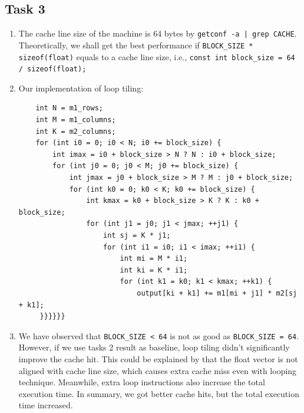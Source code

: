 \documentclass[a4paper, DIV12, headsepline]{scrartcl}
\begin{document}


\subsection*{Task 3}
\begin{enumerate}[label=\alph*)]
\item The cache line size of the machine is 64 bytes by \texttt{getconf -a | grep CACHE}. Theoretically, we shall get the best performance if \verb|BLOCK_SIZE * sizeof(float)| equals to a cache line size, i.e., \verb|const int block_size = 64 / sizeof(float);|

\item Our implementation of loop tiling:
\begin{verbatim}  
    int N = m1_rows;
    int M = m1_columns;
    int K = m2_columns;
    for (int i0 = 0; i0 < N; i0 += block_size) {
        int imax = i0 + block_size > N ? N : i0 + block_size;
        for (int j0 = 0; j0 < M; j0 += block_size) {
            int jmax = j0 + block_size > M ? M : j0 + block_size;
            for (int k0 = 0; k0 < K; k0 += block_size) {
                int kmax = k0 + block_size > K ? K : k0 + block_size;
                for (int j1 = j0; j1 < jmax; ++j1) {
                    int sj = K * j1;
                    for (int i1 = i0; i1 < imax; ++i1) {
                        int mi = M * i1;
                        int ki = K * i1;
                        for (int k1 = k0; k1 < kmax; ++k1) {
                            output[ki + k1] += m1[mi + j1] * m2[sj + k1];
     }}}}}}
\end{verbatim}
\item We have observed that \verb|BLOCK_SIZE < 64| is not as good as \verb|BLOCK_SIZE = 64|. However, if we use tasks 2 result as baseline, loop tiling didn't significantly improve the cache hit. This could be explained by that the float vector is not aligned with cache line size, which causes extra cache miss even with looping technique. Meanwhile, extra loop instructions also increase the total execution time. In summary, we got better cache hits, but the total execution time increased.



\end{enumerate}
\end{document}
